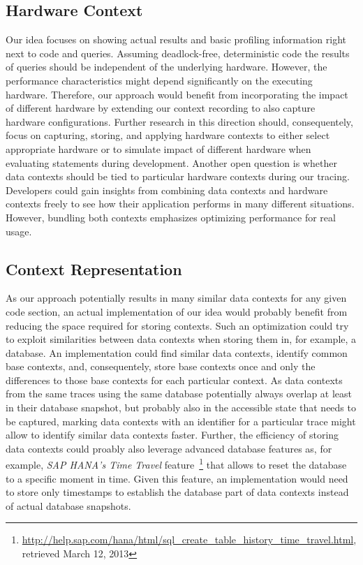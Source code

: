 \subsection{Hardware Context}
Our idea focuses on showing actual results and basic profiling information right next to code and queries.
Assuming deadlock-free, deterministic code the results of queries should be independent of the underlying hardware.
However, the performance characteristics might depend significantly on the executing hardware.
Therefore, our approach would benefit from incorporating the impact of different hardware by extending our context recording to also capture hardware configurations.
Further research in this direction should, consequentely, focus on capturing, storing, and applying hardware contexts to either select appropriate hardware  or to simulate impact of different hardware when evaluating statements during development.
Another open question is whether data contexts should be tied to particular hardware contexts during our tracing.
Developers could gain insights from combining data contexts and hardware contexts freely to see how their application performs in many different situations.
However, bundling both contexts emphasizes optimizing performance for real usage.

\subsection{Context Representation}
As our approach potentially results in many similar data contexts for any given code section, an actual implementation of our idea would probably benefit from reducing the space required for storing contexts.
Such an optimization could try to exploit similarities between data contexts when storing them in, for example, a database.
An implementation could find similar data contexts, identify common base contexts, and, consequentely, store base contexts once and only the differences to those base contexts for each particular context.
As data contexts from the same traces using the same database potentially always overlap at least in their database snapshot, but probably also in the accessible state that needs to be captured, marking data contexts with an identifier for a particular trace might allow to identify similar data contexts faster.
Further, the efficiency of storing data contexts could proably also leverage advanced database features as, for example, \emph{SAP HANA's Time Travel} feature~\footnote{\url{http://help.sap.com/hana/html/sql_create_table_history_time_travel.html}, retrieved March 12, 2013} that allows to reset the database to a specific moment in time.
Given this feature, an implementation would need to store only timestamps to establish the database part of data contexts instead of actual database snapshots.
